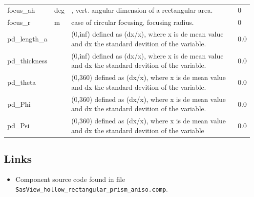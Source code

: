 \begin{longtable}{p{}p{}p{}p{}}
focus\_ah & deg & , vert. angular dimension of a rectangular area. & 0 \\
focus\_r & m & case of circular focusing, focusing radius. & 0 \\
pd\_length\_a &  & (0,inf) defined as (dx/x), where x is de mean value and dx the standard devition of the variable. & 0.0 \\
pd\_thickness &  & (0,inf) defined as (dx/x), where x is de mean value and dx the standard devition of the variable. & 0.0 \\
pd\_theta &  & (0,360) defined as (dx/x), where x is de mean value and dx the standard devition of the variable. & 0.0 \\
pd\_Phi &  & (0,360) defined as (dx/x), where x is de mean value and dx the standard devition of the variable. & 0.0 \\
pd\_Psi &  & (0,360) defined as (dx/x), where x is de mean value and dx the standard devition of the variable & 0.0 \\
\bottomrule
\end{longtable}

\subsection*{Links}
\begin{itemize}
  \item Component source code found in file \texttt{SasView\_hollow\_rectangular\_prism\_aniso.comp}.
\end{itemize}
